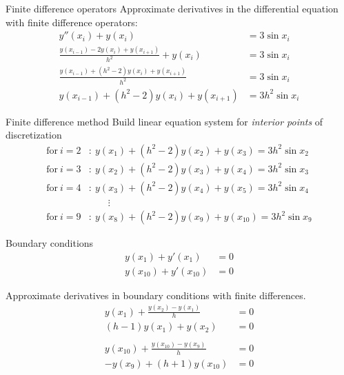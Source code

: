 \documentclass{beamer}
\begin{document}
	\begin{frame}{Finite difference operators}
		Approximate derivatives in the differential equation with finite difference operators:
		\begin{align*}
			y''(x_i) + y(x_i) &= 3 \sin x_i\\
			\frac{y(x_{i-1}) - 2y(x_i) + y(x_{i+1})}{h^2} + y(x_i) &= 3 \sin x_i\\
			\frac{y(x_{i-1}) + (h^2 - 2)y(x_i) + y(x_{i+1})}{h^2} &= 3 \sin x_i\\
			y(x_{i-1}) + (h^2 - 2)y(x_i) + y(x_{i+1}) &= 3 h^2\sin x_i
		\end{align*}		 
	\end{frame}
	
	\begin{frame}{Finite difference method}
		Build linear equation system for \textit{interior points} of discretization 
		\begin{align*}
			\text{for}\ i=2&:\ y(x_1) + (h^2 - 2)y(x_2) + y(x_3) = 3h^2\sin x_2\\
			\text{for}\ i=3&:\ y(x_2) + (h^2 - 2)y(x_3) + y(x_4) = 3h^2\sin x_3\\
			\text{for}\ i=4&:\ y(x_3) + (h^2 - 2)y(x_4) + y(x_5) = 3h^2\sin x_4\\
			&\qquad\vdots\\
			\text{for}\ i=9&:\ y(x_8) + (h^2 - 2)y(x_9) + y(x_{10}) = 3h^2\sin x_9
		\end{align*}
	\end{frame}
	
	\begin{frame}{Boundary conditions}
		\begin{align*}
			y(x_1) + y'(x_1) &= 0\\
			y(x_{10}) + y'(x_{10}) &= 0
		\end{align*}
		
		Approximate derivatives in boundary conditions with finite differences. 
		\begin{align*}
			y(x_1) + \frac{y(x_{2}) - y(x_{1})}{h} &= 0\\
			(h-1)y(x_1)+ y(x_{2}) &= 0\\~\\
			y(x_{10}) + \frac{y(x_{10}) - y(x_{9})}{h} &= 0\\
			-y(x_9) + (h+1) y(x_{10}) &= 0\\~\\
		\end{align*}
	\end{frame}
	
\end{document}

